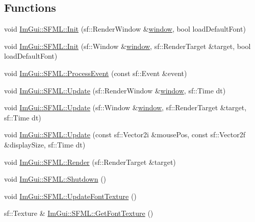 \subsection*{Functions}
\begin{DoxyCompactItemize}
\item 
void \mbox{\hyperlink{namespace_im_gui_1_1_s_f_m_l_ab68ea5215c08d005c6db5e5995c111ad}{Im\+Gui\+::\+S\+F\+M\+L\+::\+Init}} (sf\+::\+Render\+Window \&\mbox{\hyperlink{_globals_8cpp_ae227837337adb8c62b56e2930ad81cda}{window}}, bool load\+Default\+Font)
\item 
void \mbox{\hyperlink{namespace_im_gui_1_1_s_f_m_l_a52384615894fc35d07dfaccb1bcdb514}{Im\+Gui\+::\+S\+F\+M\+L\+::\+Init}} (sf\+::\+Window \&\mbox{\hyperlink{_globals_8cpp_ae227837337adb8c62b56e2930ad81cda}{window}}, sf\+::\+Render\+Target \&target, bool load\+Default\+Font)
\item 
void \mbox{\hyperlink{namespace_im_gui_1_1_s_f_m_l_a2086627a77c5a874cd299060b5f1c270}{Im\+Gui\+::\+S\+F\+M\+L\+::\+Process\+Event}} (const sf\+::\+Event \&event)
\item 
void \mbox{\hyperlink{namespace_im_gui_1_1_s_f_m_l_a6ac5b3b4d267251063f3697b9fa0ac7d}{Im\+Gui\+::\+S\+F\+M\+L\+::\+Update}} (sf\+::\+Render\+Window \&\mbox{\hyperlink{_globals_8cpp_ae227837337adb8c62b56e2930ad81cda}{window}}, sf\+::\+Time dt)
\item 
void \mbox{\hyperlink{namespace_im_gui_1_1_s_f_m_l_ad35c61a45ad310ce53f91db317de0244}{Im\+Gui\+::\+S\+F\+M\+L\+::\+Update}} (sf\+::\+Window \&\mbox{\hyperlink{_globals_8cpp_ae227837337adb8c62b56e2930ad81cda}{window}}, sf\+::\+Render\+Target \&target, sf\+::\+Time dt)
\item 
void \mbox{\hyperlink{namespace_im_gui_1_1_s_f_m_l_a23e3d87824f8ec92ec879aa5fda774f4}{Im\+Gui\+::\+S\+F\+M\+L\+::\+Update}} (const sf\+::\+Vector2i \&mouse\+Pos, const sf\+::\+Vector2f \&display\+Size, sf\+::\+Time dt)
\item 
void \mbox{\hyperlink{namespace_im_gui_1_1_s_f_m_l_a850ba18f010cf284347e6cbc2abb8dc4}{Im\+Gui\+::\+S\+F\+M\+L\+::\+Render}} (sf\+::\+Render\+Target \&target)
\item 
void \mbox{\hyperlink{namespace_im_gui_1_1_s_f_m_l_a2e9801a991d524d4f26a5933cdf29e3d}{Im\+Gui\+::\+S\+F\+M\+L\+::\+Shutdown}} ()
\item 
void \mbox{\hyperlink{namespace_im_gui_1_1_s_f_m_l_a1f969f6c562da1c000f4d5277a8ff075}{Im\+Gui\+::\+S\+F\+M\+L\+::\+Update\+Font\+Texture}} ()
\item 
sf\+::\+Texture \& \mbox{\hyperlink{namespace_im_gui_1_1_s_f_m_l_af66dae79d407cf9230b3e1f2b5e9bdb2}{Im\+Gui\+::\+S\+F\+M\+L\+::\+Get\+Font\+Texture}} ()

\end{DoxyCompactItemize}
